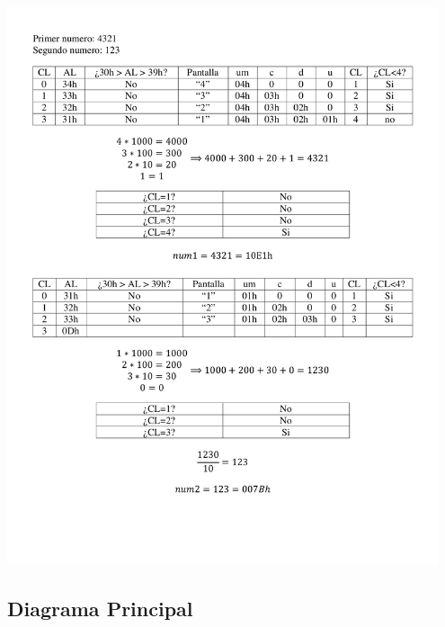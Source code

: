 \documentclass[letter,12 pt,titlepage]{article}
\begin{document}
    \begin{center}
    \includegraphics[width=0.95\textwidth]{img/Primer numero.pdf}
    \end{center}

    \subsection{Diagrama Principal}
\end{document}
